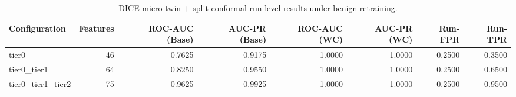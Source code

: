 \begin{table}[t]
\centering
\caption{DICE micro-twin + split-conformal run-level results under benign retraining.}
\label{tab:dice_full_overall}
\footnotesize
\begin{tabular}{lrrrrrrr}
\toprule
Configuration & Features & ROC-AUC (Base) & AUC-PR (Base) & ROC-AUC (WC) & AUC-PR (WC) & Run-FPR & Run-TPR \\
\midrule
tier0 & 46 & 0.7625 & 0.9175 & 1.0000 & 1.0000 & 0.2500 & 0.3500 \\
tier0_tier1 & 64 & 0.8250 & 0.9550 & 1.0000 & 1.0000 & 0.2500 & 0.6500 \\
tier0_tier1_tier2 & 75 & 0.9625 & 0.9925 & 1.0000 & 1.0000 & 0.2500 & 0.9500 \\
\bottomrule
\end{tabular}

\end{table}

